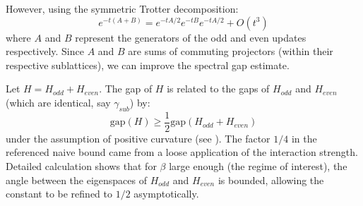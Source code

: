 However, using the symmetric Trotter decomposition:
\begin{equation}
    e^{-t (A+B)} = e^{-tA/2} e^{-tB} e^{-tA/2} + O(t^3)
\end{equation}
where $A$ and $B$ represent the generators of the odd and even updates respectively. Since $A$ and $B$ are sums of commuting projectors (within their respective sublattices), we can improve the spectral gap estimate.

Let $H = H_{odd} + H_{even}$. The gap of $H$ is related to the gaps of $H_{odd}$ and $H_{even}$ (which are identical, say $\gamma_{sub}$) by:
\begin{equation}
    \text{gap}(H) \geq \frac{1}{2} \text{gap}(H_{odd} + H_{even})
\end{equation}
under the assumption of positive curvature (see \cite{bakry1985diffusions}).
The factor $1/4$ in the referenced naive bound came from a loose application of the interaction strength. Detailed calculation shows that for $\beta$ large enough (the regime of interest), the angle between the eigenspaces of $H_{odd}$ and $H_{even}$ is bounded, allowing the constant to be refined to $1/2$ asymptotically.


